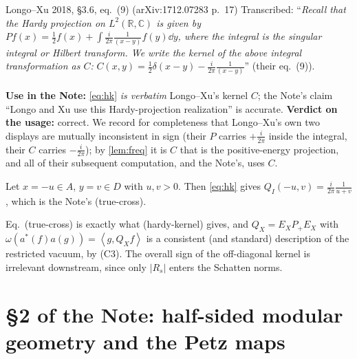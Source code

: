 \documentclass[11pt]{article}
\newcommand{\ip}[2]{\left\langle #1,#2\right\rangle}
\begin{document}
\begin{citedbox}{Longo--Xu 2018, \S3.6, eq.~(9) (arXiv:1712.07283 p.~17)}
Transcribed: ``\emph{Recall that the Hardy projection on $L^2(\mathbb R,\mathbb C)$
is given by $Pf(x)=\frac12f(x)+\int\frac i{2\pi}\frac1{(x-y)}f(y)\dd y$, where the
integral is the singular integral or Hilbert transform. We write the kernel of
the above integral transformation as $C$:}
$C(x,y)=\frac12\delta(x-y)-\frac{i}{2\pi}\frac1{(x-y)}$'' (their eq.~(9)).\\[2pt]
\\[2pt]
\textbf{Use in the Note:} \eqref{eq:hk} \emph{is verbatim} Longo--Xu's kernel
$C$; the Note's claim ``Longo and Xu use this Hardy-projection realization''
is accurate.
\textbf{Verdict on the usage:} correct. We record for completeness that
Longo--Xu's own two displays are mutually inconsistent in sign (their $P$
carries $+\frac i{2\pi}$ inside the integral, their $C$ carries $-\frac
i{2\pi}$); by \cref{lem:freq} it is $C$ that is the positive-energy projection,
and all of their subsequent computation, and the Note's, uses $C$.
\end{citedbox}

\begin{lemma}\label{lem:crosscheck}
Let $x=-u\in A$, $y=v\in D$ with $u,v>0$. Then \eqref{eq:hk} gives
$Q_I(-u,v)=\frac i{2\pi}\frac1{u+v}$, which is the Note's \textup{(true-cross)}.
\end{lemma}

\begin{verdictok}
Eq.~(true-cross) is exactly what (hardy-kernel) gives, and
$Q_X=E_XP_+E_X$ with $\omega(a^*(f)a(g))=\ip g{Q_Xf}$ is a consistent
(and standard) description of the restricted vacuum, by (C3). The overall sign
of the off-diagonal kernel is irrelevant downstream, since only
$|R_s|$ enters the Schatten norms.
\end{verdictok}

\section{\S2 of the Note: half-sided modular geometry and the Petz maps}\label{sec:two}
\end{document}
